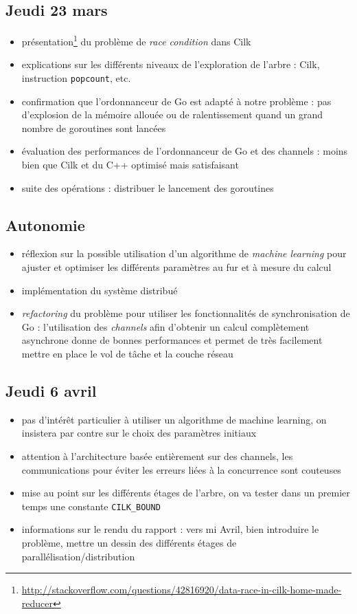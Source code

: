 \documentclass[12pt,a4paper]{report}
\begin{document}
\subsection*{Jeudi 23 mars}
\begin{itemize}
	\item	présentation\footnote{\url{http://stackoverflow.com/questions/42816920/data-race-in-cilk-home-made-reducer}} du problème de \emph{race condition} dans Cilk
	\item	explications sur les différents niveaux de l'exploration de l'arbre : Cilk, instruction \texttt{popcount}, etc.
	\item	confirmation que l'ordonnanceur de Go est adapté à notre problème : pas d'explosion de la mémoire allouée ou de ralentissement quand un grand nombre de goroutines sont lancées
	\item	évaluation des performances de l'ordonnanceur de Go et des channels : moins bien que Cilk et du C++ optimisé mais satisfaisant
	\item	suite des opérations : distribuer le lancement des goroutines
\end{itemize}

\subsection*{Autonomie}
\begin{itemize}
	\item	réflexion sur la possible utilisation d'un algorithme de \emph{machine learning} pour ajuster et optimiser les différents paramètres au fur et à mesure du calcul
	\item	implémentation du système distribué
	\item	\emph{refactoring} du problème pour utiliser les fonctionnalités de synchronisation de Go : l'utilisation des \emph{channels} afin d'obtenir un calcul complètement asynchrone donne de bonnes performances et permet de très facilement mettre en place le vol de tâche et la couche réseau
\end{itemize}

\subsection*{Jeudi 6 avril}
\begin{itemize}
	\item	pas d'intérêt particulier à utiliser un algorithme de machine learning, on insistera par contre sur le choix des paramètres initiaux
	\item	attention à l'architecture basée entièrement sur des channels, les communications pour éviter les erreurs liées à la concurrence sont couteuses
	\item	mise au point sur les différents étages de l'arbre, on va tester dans un premier temps une constante \texttt{CILK\_BOUND}
	\item	informations sur le rendu du rapport : vers mi Avril, bien introduire le problème, mettre un dessin des différents étages de parallélisation/distribution
\end{itemize}
\end{document}
